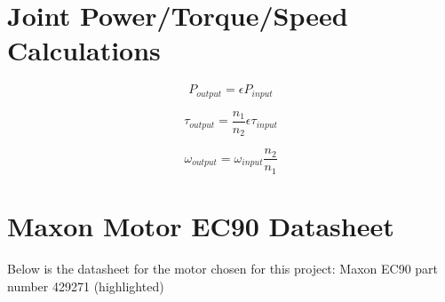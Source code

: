 \appendix

\chapter{Joint Power/Torque/Speed Calculations}
\label{apx:JointPowerTorqueSpeedCalcs}

\begin{equation}
    P_{output} = \epsilon P_{input} 
     \label{eq:PowerCalc}
\end{equation}

\begin{equation}
    \tau_{output} =   \frac{n_1}{n_2}  \epsilon  \tau_{input}
    \label{eq:TorqueCalc}
\end{equation}

\begin{equation}
    \omega_{output} = \omega_{input}  \frac{n_2}{n_1}
    \label{eq:SpeedCalc}
\end{equation}

\chapter{Maxon Motor EC90 Datasheet}
\label{apx:EC90Datasheet}
Below is the datasheet for the motor chosen for this project: Maxon EC90 part number 429271 (highlighted)


